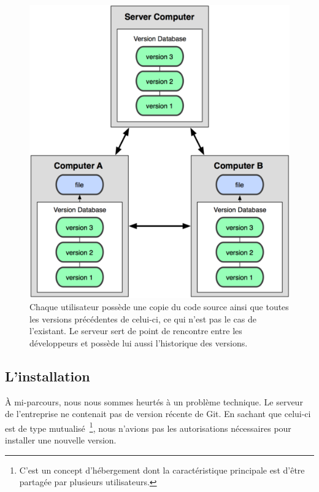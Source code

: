 \begin{figure}
  \begin{center}
    \includegraphics[scale=1.57]{images/workflow.png}
    \caption{ Chaque utilisateur possède une copie du code source
    ainsi que toutes les versions précédentes de celui-ci, ce qui n'est pas
    le cas de l'existant. Le serveur sert de point de rencontre entre les
    développeurs et possède lui aussi l’historique des versions.}
    \label{flow}
  \end{center}
\end{figure}

\subsection{L'installation} %
\label{sub:L'installation}

À mi-parcours, nous nous sommes heurtés à un problème technique. Le
serveur de l'entreprise ne contenait pas de version récente de Git. En
sachant que celui-ci est de type mutualisé\, \footnote{C'est un concept
d'hébergement dont la caractéristique principale est d'être partagée par
plusieurs utilisateurs.}, nous n'avions pas les autorisations
nécessaires pour installer une nouvelle version.


